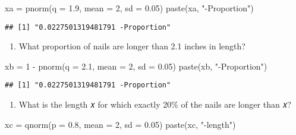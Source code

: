 \documentclass[
]{article}
\newenvironment{Shaded}{\begin{snugshade}}{\end{snugshade}}
\newcommand{\AttributeTok}[1]{\textcolor[rgb]{0.77,0.63,0.00}{#1}}
\newcommand{\DecValTok}[1]{\textcolor[rgb]{0.00,0.00,0.81}{#1}}
\newcommand{\FloatTok}[1]{\textcolor[rgb]{0.00,0.00,0.81}{#1}}
\newcommand{\FunctionTok}[1]{\textcolor[rgb]{0.00,0.00,0.00}{#1}}
\newcommand{\NormalTok}[1]{#1}
\newcommand{\OtherTok}[1]{\textcolor[rgb]{0.56,0.35,0.01}{#1}}
\newcommand{\SpecialCharTok}[1]{\textcolor[rgb]{0.00,0.00,0.00}{#1}}
\newcommand{\StringTok}[1]{\textcolor[rgb]{0.31,0.60,0.02}{#1}}
\providecommand{\tightlist}{%
  \setlength{\itemsep}{0pt}\setlength{\parskip}{0pt}}
\begin{document}
\begin{Shaded}
\begin{Highlighting}[]
\NormalTok{xa }\OtherTok{=} \FunctionTok{pnorm}\NormalTok{(}\AttributeTok{q =} \FloatTok{1.9}\NormalTok{, }\AttributeTok{mean =} \DecValTok{2}\NormalTok{, }\AttributeTok{sd =} \FloatTok{0.05}\NormalTok{)}
\FunctionTok{paste}\NormalTok{(xa, }\StringTok{"{-}Proportion"}\NormalTok{)}
\end{Highlighting}
\end{Shaded}

\begin{verbatim}
## [1] "0.0227501319481791 -Proportion"
\end{verbatim}

\begin{enumerate}
\def\labelenumi{\alph{enumi}.}
\setcounter{enumi}{1}
\tightlist
\item
  What proportion of nails are longer than 2.1 inches in length?
\end{enumerate}

\begin{Shaded}
\begin{Highlighting}[]
\NormalTok{xb }\OtherTok{=} \DecValTok{1} \SpecialCharTok{{-}} \FunctionTok{pnorm}\NormalTok{(}\AttributeTok{q =} \FloatTok{2.1}\NormalTok{, }\AttributeTok{mean =} \DecValTok{2}\NormalTok{, }\AttributeTok{sd =} \FloatTok{0.05}\NormalTok{)}
\FunctionTok{paste}\NormalTok{(xb, }\StringTok{"{-}Proportion"}\NormalTok{)}
\end{Highlighting}
\end{Shaded}

\begin{verbatim}
## [1] "0.0227501319481791 -Proportion"
\end{verbatim}

\begin{enumerate}
\def\labelenumi{\alph{enumi}.}
\setcounter{enumi}{2}
\tightlist
\item
  What is the length 𝑥 for which exactly 20\% of the nails are longer
  than 𝑥?
\end{enumerate}

\begin{Shaded}
\begin{Highlighting}[]
\NormalTok{xc }\OtherTok{=} \FunctionTok{qnorm}\NormalTok{(}\AttributeTok{p =} \FloatTok{0.8}\NormalTok{, }\AttributeTok{mean =} \DecValTok{2}\NormalTok{, }\AttributeTok{sd =} \FloatTok{0.05}\NormalTok{)}
\FunctionTok{paste}\NormalTok{(xc, }\StringTok{"{-}length"}\NormalTok{)  }
\end{Highlighting}
\end{Shaded}
\end{document}
